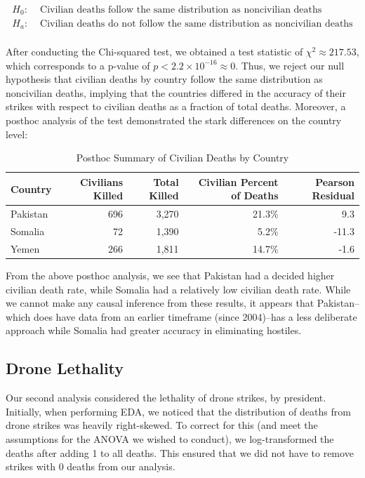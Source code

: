 \documentclass[
]{article}
\begin{document}
\[
\begin{aligned}
H_0: & \text{ Civilian deaths follow the same distribution as noncivilian deaths}\\
H_a: & \text{ Civilian deaths do not follow the same distribution as noncivilian deaths}\\
\end{aligned}
\]

After conducting the Chi-squared test, we obtained a test statistic of
\(\chi^2 \approx 217.53\), which corresponds to a p-value of
\(p < 2.2 \times 10^{-16} \approx 0\). Thus, we reject our null
hypothesis that civilian deaths by country follow the same distribution
as noncivilian deaths, implying that the countries differed in the
accuracy of their strikes with respect to civilian deaths as a fraction
of total deaths. Moreover, a posthoc analysis of the test demonstrated
the stark differences on the country level:

\begin{table}[H]

\caption{\label{tab:drone_acc_posthoc}Posthoc Summary of Civilian Deaths by Country}
\centering
\begin{tabular}[t]{lrrrr}
\toprule
Country & Civilians Killed & Total Killed & Civilian Percent of Deaths & Pearson Residual\\
\midrule
Pakistan & 696 & 3,270 & 21.3\% & 9.3\\
Somalia & 72 & 1,390 & 5.2\% & -11.3\\
Yemen & 266 & 1,811 & 14.7\% & -1.6\\
\bottomrule
\end{tabular}
\end{table}

From the above posthoc analysis, we see that Pakistan had a decided
higher civilian death rate, while Somalia had a relatively low civilian
death rate. While we cannot make any causal inference from these
results, it appears that Pakistan--which does have data from an earlier
timeframe (since 2004)--has a less deliberate approach while Somalia had
greater accuracy in eliminating hostiles.

\hypertarget{drone-lethality}{%
\subsection{Drone Lethality}\label{drone-lethality}}

Our second analysis considered the lethality of drone strikes, by
president. Initially, when performing EDA, we noticed that the
distribution of deaths from drone strikes was heavily right-skewed. To
correct for this (and meet the assumptions for the ANOVA we wished to
conduct), we log-transformed the deaths after adding 1 to all deaths.
This ensured that we did not have to remove strikes with 0 deaths from
our analysis.
\end{document}

